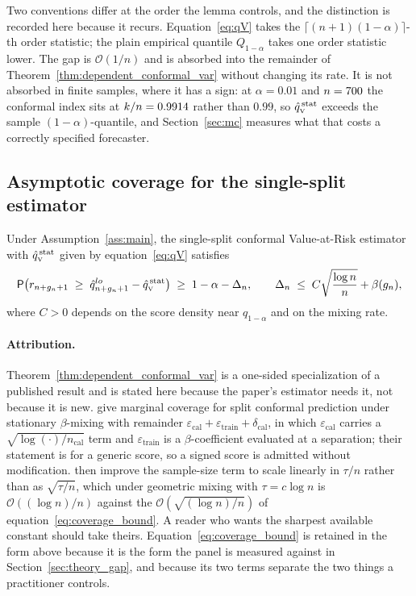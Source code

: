 Two conventions differ at the order the lemma controls, and the distinction is
recorded here because it recurs. Equation~\eqref{eq:qV} takes the
$\lceil (n+1)(1-\alpha)\rceil$-th order statistic; the plain empirical quantile
$Q_{1-\alpha}$ takes one order statistic lower. The gap is $\mathcal O(1/n)$ and
is absorbed into the remainder of Theorem~\ref{thm:dependent_conformal_var}
without changing its rate. It is not absorbed in finite samples, where it has a
sign: at $\alpha = 0.01$ and $n = 700$ the conformal index sits at
$k/n = 0.9914$ rather than $0.99$, so $\hat{q}_{\scriptscriptstyle\mathrm{V}}^{\,\mathrm{stat}}$ exceeds the sample
$(1-\alpha)$-quantile, and Section~\ref{sec:mc} measures what that costs a
correctly specified forecaster.

\subsection{Asymptotic coverage for the single-split estimator}
\label{sec:theory_theorem}

\begin{theorem}
	\label{thm:dependent_conformal_var}
	Under Assumption~\ref{ass:main}, the single-split conformal Value-at-Risk
	estimator with $\hat{q}_{\scriptscriptstyle\mathrm{V}}^{\,\mathrm{stat}}$ given by equation~\eqref{eq:qV} satisfies
	\begin{equation}
		\label{eq:coverage_bound}
		\mathsf{P}\!\left(
		r_{n+g_n+1}\;\ge\;\hat q^{lo}_{n+g_n+1}-\hat{q}_{\scriptscriptstyle\mathrm{V}}^{\,\mathrm{stat}}
		\right)
		\;\ge\;
		1-\alpha-\Delta_n,
		\qquad
		\Delta_n \;\le\; C\sqrt{\frac{\log n}{n}}+\beta(g_n),
	\end{equation}
	where $C>0$ depends on the score density near $q_{1-\alpha}$ and on the
	mixing rate.
\end{theorem}

\paragraph{Attribution.} Theorem~\ref{thm:dependent_conformal_var} is a
one-sided specialization of a published result and is stated here because the
paper's estimator needs it, not because it is new. \citet[Theorem~4]{oliveira2024split}
give marginal coverage for split conformal prediction under stationary
$\beta$-mixing with remainder $\varepsilon_{\mathrm{cal}} +
\varepsilon_{\mathrm{train}} + \delta_{\mathrm{cal}}$, in which
$\varepsilon_{\mathrm{cal}}$ carries a $\sqrt{\log(\cdot)/n_{\mathrm{cal}}}$
term and $\varepsilon_{\mathrm{train}}$ is a $\beta$-coefficient evaluated at a
separation; their statement is for a generic score, so a signed score is admitted
without modification. \citet{barber2026predictive} then improve the sample-size
term to scale linearly in $\tau/n$ rather than as $\sqrt{\tau/n}$, which under
geometric mixing with $\tau = c\log n$ is $\mathcal O((\log n)/n)$ against the
$\mathcal O(\sqrt{(\log n)/n})$ of equation~\eqref{eq:coverage_bound}. A reader
who wants the sharpest available constant should take theirs. Equation~\eqref{eq:coverage_bound}
is retained in the form above because it is the form the panel is measured
against in Section~\ref{sec:theory_gap}, and because its two terms separate the
two things a practitioner controls.

